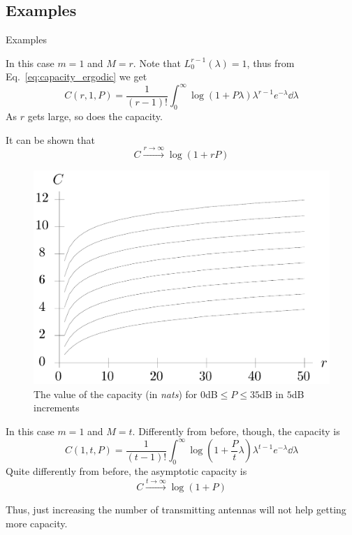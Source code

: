 \subsection{Examples}
\begin{frame}[allowframebreaks]{Examples}

\begin{example}[$t=1$]
	In this case $m=1$ and $M=r$. Note that $L_0^{r-1}(\lambda)=1$, thus from Eq.~\eqref{eq:capacity_ergodic} we get
	$$C(r,1,P) = \frac{1}{(r-1)!}
	\int_0^\infty \log(1+P\lambda)
	\lambda^{r-1} e^{-\lambda}
	\dd{\lambda}$$
	As $r$ gets large, so does the capacity.
	
	It can be shown that
	$$C \xrightarrow{r\rightarrow\infty} \log(1+rP)$$
\end{example}

\begin{example}[$t=1$]
\begin{figure}
	\centering
	\includegraphics[width=0.6\linewidth]{img/capacity_t1}
	\caption{The value of the capacity (in \textit{nats}) for $0$dB$\leq P\leq 35$dB in $5$dB increments}
	\label{fig:capacity_t1}
\end{figure}
\end{example}

\begin{example}[$r=1$]
	In this case $m=1$ and $M=t$. Differently from before, though, the capacity is
	$$C(1,t,P) = \frac{1}{(t-1)!}
	\int_0^\infty \log(1+\frac{P}{t}\lambda)
	\lambda^{t-1} e^{-\lambda}
	\dd{\lambda}$$
	Quite differently from before, the asymptotic capacity is 
	$$C \xrightarrow{t\rightarrow\infty} \log(1+P)$$
\end{example}
Thus, just increasing the number of transmitting antennas will not help getting more capacity.


\end{frame}

